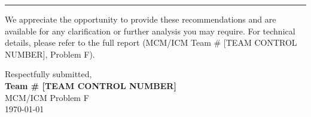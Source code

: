 \documentclass[12pt, a4paper]{article}
\begin{document}
\vspace{0.5cm}
\rule{\textwidth}{0.5pt}

\vspace{0.3cm}

\noindent
We appreciate the opportunity to provide these recommendations and
are available for any clarification or further analysis you may
require. For technical details, please refer to the full report
(MCM/ICM Team \# [TEAM CONTROL NUMBER], Problem F).

\vspace{0.5cm}

\noindent
Respectfully submitted, \\[1cm]

\noindent
\textbf{Team \# [TEAM CONTROL NUMBER]} \\
MCM/ICM Problem F \\
\today
\end{document}
